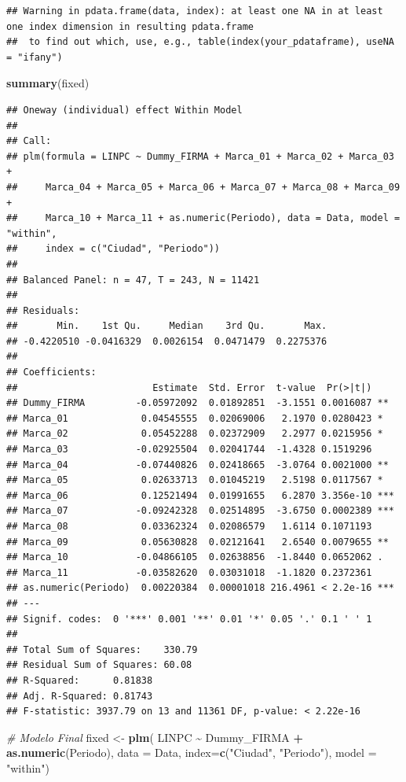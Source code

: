 \documentclass[
]{book}
\newenvironment{Shaded}{\begin{snugshade}}{\end{snugshade}}
\newcommand{\AttributeTok}[1]{\textcolor[rgb]{0.13,0.29,0.53}{#1}}
\newcommand{\CommentTok}[1]{\textcolor[rgb]{0.56,0.35,0.01}{\textit{#1}}}
\newcommand{\FunctionTok}[1]{\textcolor[rgb]{0.13,0.29,0.53}{\textbf{#1}}}
\newcommand{\NormalTok}[1]{#1}
\newcommand{\OtherTok}[1]{\textcolor[rgb]{0.56,0.35,0.01}{#1}}
\newcommand{\SpecialCharTok}[1]{\textcolor[rgb]{0.81,0.36,0.00}{\textbf{#1}}}
\newcommand{\StringTok}[1]{\textcolor[rgb]{0.31,0.60,0.02}{#1}}
\begin{document}
\begin{verbatim}
## Warning in pdata.frame(data, index): at least one NA in at least one index dimension in resulting pdata.frame
##  to find out which, use, e.g., table(index(your_pdataframe), useNA = "ifany")
\end{verbatim}

\begin{Shaded}
\begin{Highlighting}[]
\FunctionTok{summary}\NormalTok{(fixed)}
\end{Highlighting}
\end{Shaded}

\begin{verbatim}
## Oneway (individual) effect Within Model
## 
## Call:
## plm(formula = LINPC ~ Dummy_FIRMA + Marca_01 + Marca_02 + Marca_03 + 
##     Marca_04 + Marca_05 + Marca_06 + Marca_07 + Marca_08 + Marca_09 + 
##     Marca_10 + Marca_11 + as.numeric(Periodo), data = Data, model = "within", 
##     index = c("Ciudad", "Periodo"))
## 
## Balanced Panel: n = 47, T = 243, N = 11421
## 
## Residuals:
##       Min.    1st Qu.     Median    3rd Qu.       Max. 
## -0.4220510 -0.0416329  0.0026154  0.0471479  0.2275376 
## 
## Coefficients:
##                        Estimate  Std. Error  t-value  Pr(>|t|)    
## Dummy_FIRMA         -0.05972092  0.01892851  -3.1551 0.0016087 ** 
## Marca_01             0.04545555  0.02069006   2.1970 0.0280423 *  
## Marca_02             0.05452288  0.02372909   2.2977 0.0215956 *  
## Marca_03            -0.02925504  0.02041744  -1.4328 0.1519296    
## Marca_04            -0.07440826  0.02418665  -3.0764 0.0021000 ** 
## Marca_05             0.02633713  0.01045219   2.5198 0.0117567 *  
## Marca_06             0.12521494  0.01991655   6.2870 3.356e-10 ***
## Marca_07            -0.09242328  0.02514895  -3.6750 0.0002389 ***
## Marca_08             0.03362324  0.02086579   1.6114 0.1071193    
## Marca_09             0.05630828  0.02121641   2.6540 0.0079655 ** 
## Marca_10            -0.04866105  0.02638856  -1.8440 0.0652062 .  
## Marca_11            -0.03582620  0.03031018  -1.1820 0.2372361    
## as.numeric(Periodo)  0.00220384  0.00001018 216.4961 < 2.2e-16 ***
## ---
## Signif. codes:  0 '***' 0.001 '**' 0.01 '*' 0.05 '.' 0.1 ' ' 1
## 
## Total Sum of Squares:    330.79
## Residual Sum of Squares: 60.08
## R-Squared:      0.81838
## Adj. R-Squared: 0.81743
## F-statistic: 3937.79 on 13 and 11361 DF, p-value: < 2.22e-16
\end{verbatim}

\begin{Shaded}
\begin{Highlighting}[]
\CommentTok{\# Modelo Final}
\NormalTok{fixed }\OtherTok{\textless{}{-}} \FunctionTok{plm}\NormalTok{( LINPC }\SpecialCharTok{\textasciitilde{}}\NormalTok{ Dummy\_FIRMA }\SpecialCharTok{+} \FunctionTok{as.numeric}\NormalTok{(Periodo),}
             \AttributeTok{data =}\NormalTok{ Data, }
             \AttributeTok{index=}\FunctionTok{c}\NormalTok{(}\StringTok{"Ciudad"}\NormalTok{, }\StringTok{"Periodo"}\NormalTok{), }
             \AttributeTok{model =} \StringTok{"within"}\NormalTok{)}
\end{Highlighting}
\end{Shaded}
\end{document}
